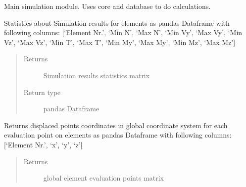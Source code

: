 \documentclass[letterpaper,10pt,english]{sphinxmanual}
\begin{document}
\begin{fulllineitems}
\label{\detokenize{api:beamon.simulation.Simulation}}
Main simulation module. Uses core and database to do calculations.

\begin{fulllineitems}
\label{\detokenize{api:beamon.simulation.Simulation.element_stats}}
Statistics about Simulation results for elements as pandas Dataframe with following columns:
{[}‘Element Nr.’, ‘Min N’, ‘Max N’, ‘Min Vy’, ‘Max Vy’, ‘Min Vz’, ‘Max Vz’, ‘Min T’, ‘Max T’, ‘Min My’, ‘Max My’,
‘Min Mz’, ‘Max Mz’{]}
\begin{quote}\begin{description}
\item[{Returns}] \leavevmode
Simulation results statistics matrix

\item[{Return type}] \leavevmode
pandas Dataframe

\end{description}\end{quote}

\end{fulllineitems}


\begin{fulllineitems}
\label{\detokenize{api:beamon.simulation.Simulation.global_element_displaced_points}}
Returns displaced points coordinates in global coordinate system for each evaluation point on elements
as pandas Dataframe with following columns:
{[}‘Element Nr.’, ‘x’, ‘y’, ‘z’{]}
\begin{quote}\begin{description}
\item[{Returns}] \leavevmode
global element evaluation points matrix


\end{description}
\end{quote}
\end{fulllineitems}
\end{fulllineitems}
\end{document}
